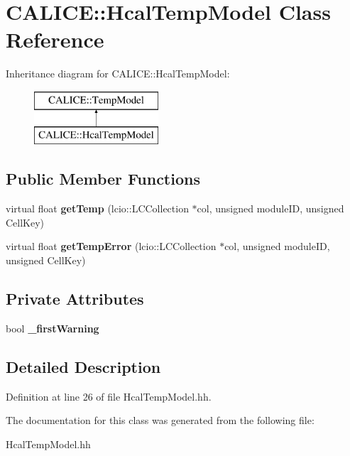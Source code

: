 \section{C\-A\-L\-I\-C\-E\-:\-:Hcal\-Temp\-Model Class Reference}
\label{classCALICE_1_1HcalTempModel}
Inheritance diagram for C\-A\-L\-I\-C\-E\-:\-:Hcal\-Temp\-Model\-:\begin{figure}[H]
\begin{center}
\leavevmode
\includegraphics[height=2.000000cm]{classCALICE_1_1HcalTempModel}
\end{center}
\end{figure}
\subsection*{Public Member Functions}
\begin{DoxyCompactItemize}
\item 
virtual float {\bfseries get\-Temp} (lcio\-::\-L\-C\-Collection $\ast$col, unsigned module\-I\-D, unsigned Cell\-Key)\label{classCALICE_1_1HcalTempModel_a76afabe82f217f618a8f20098c9cb91b}

\item 
virtual float {\bfseries get\-Temp\-Error} (lcio\-::\-L\-C\-Collection $\ast$col, unsigned module\-I\-D, unsigned Cell\-Key)\label{classCALICE_1_1HcalTempModel_a4f7355963e4df4c83efb5135a241f785}

\end{DoxyCompactItemize}
\subsection*{Private Attributes}
\begin{DoxyCompactItemize}
\item 
bool {\bfseries \-\_\-first\-Warning}\label{classCALICE_1_1HcalTempModel_a883bb0526e7d1310bedd3f10bfd4e314}

\end{DoxyCompactItemize}


\subsection{Detailed Description}


Definition at line 26 of file Hcal\-Temp\-Model.\-hh.



The documentation for this class was generated from the following file\-:\begin{DoxyCompactItemize}
\item 
Hcal\-Temp\-Model.\-hh\end{DoxyCompactItemize}
